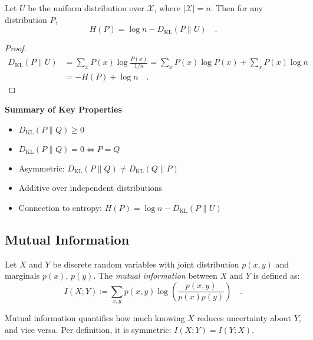 \documentclass[../../main.tex]{subfiles}
\begin{document}
\begin{proposition}
    Let \( U \) be the uniform distribution over \( \mathcal{X} \), where \( |\mathcal{X}| = n \). Then for any distribution \( P \),
    \[
        H(P) = \log n - D_{\mathrm{KL}}(P \| U) \quad .
    \]
\end{proposition}
\begin{proof}
    \begin{align*}
        D_{\mathrm{KL}}(P \| U) &= \sum_{x} P(x) \log \frac{P(x)}{1/n}
        = \sum_{x} P(x) \log P(x) + \sum_{x} P(x) \log n \\
        &= -H(P) + \log n \quad .
    \end{align*}
\end{proof}

\textbf{Summary of Key Properties}
\begin{itemize}[leftmargin=1.2cm]
    \item \( D_{\mathrm{KL}}(P \| Q) \geq 0 \)
    \item \( D_{\mathrm{KL}}(P \| Q) = 0 \iff P = Q \)
    \item Asymmetric: \( D_{\mathrm{KL}}(P \| Q) \neq D_{\mathrm{KL}}(Q \| P) \)
    \item Additive over independent distributions
    \item Connection to entropy: \( H(P) = \log n - D_{\mathrm{KL}}(P \| U) \)
\end{itemize}


\subsection{Mutual Information}
\label{sec:mutual_information}

\begin{definition}
    Let \( X \) and \( Y \) be discrete random variables with joint distribution \( p(x, y) \) and marginals \( p(x) \), \( p(y) \). The \emph{mutual information} between \( X \) and \( Y \) is defined as:
    \[
        I(X; Y) \coloneqq \sum_{x, y} p(x, y) \log \left( \frac{p(x, y)}{p(x) p(y)} \right) \quad .
    \]
\end{definition}

\begin{remark}
    Mutual information quantifies how much knowing \( X \) reduces uncertainty about \( Y \), and vice versa. Per definition, it is symmetric: \( I(X; Y) = I(Y; X) \).
\end{remark}
\end{document}
